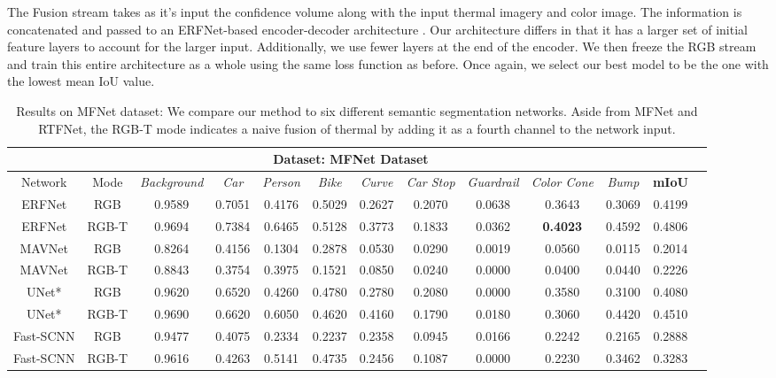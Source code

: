 \documentclass[letterpaper, 10 pt, conference]{ieeeconf}
\begin{document}
The Fusion stream takes as it's input the confidence volume along with the input thermal imagery and color image. The information is concatenated and passed to an ERFNet-based encoder-decoder architecture \cite{romera2017erfnet}. Our architecture differs in that it has a larger set of initial feature layers to account for the larger input. Additionally, we use fewer layers at the end of the encoder. We then freeze the RGB stream and train this entire architecture as a whole using the same loss function as before. Once again, we select our best model to be the one with the lowest mean IoU value.

\begin{table*}[htb!]
\centering
\caption{Results on MFNet dataset: We compare our method to six different semantic segmentation networks. Aside from MFNet and RTFNet, the RGB-T mode indicates a naive fusion of thermal by adding it as a fourth channel to the network input.}
\vspace{-0.25cm}
\begin{tabular}{|c|c|c|c|c|c|c|c|c|c|c|c|c|}
 \hline
 \multicolumn{12}{|c|}{Dataset: \textbf{MFNet Dataset}} \\
 \hline
 Network & Mode & \textit{Background} & \textit{Car} & \textit{Person} & \textit{Bike} & \textit{Curve} & \textit{Car Stop} & \textit{Guardrail} & \textit{Color Cone} & \textit{Bump} & \textbf{mIoU}\\
 \hline
 ERFNet & RGB  & 0.9589 & 0.7051 & 0.4176 & 0.5029 & 0.2627 & 0.2070 & 0.0638 & 0.3643 & 0.3069 & 0.4199\\
 ERFNet & RGB-T & 0.9694 & 0.7384 & 0.6465 & 0.5128 & 0.3773 & 0.1833 & 0.0362 & \textbf{0.4023} & 0.4592 & 0.4806\\
 MAVNet & RGB & 0.8264 & 0.4156 & 0.1304 & 0.2878 & 0.0530 & 0.0290 & 0.0019 & 0.0560 & 0.0115 & 0.2014\\
 MAVNet & RGB-T & 0.8843 & 0.3754 & 0.3975 & 0.1521 & 0.0850 & 0.0240 & 0.0000 & 0.0400 & 0.0440 & 0.2226\\
 UNet* & RGB & 0.9620 & 0.6520 & 0.4260 & 0.4780 & 0.2780 & 0.2080 & 0.0000 & 0.3580 & 0.3100 & 0.4080\\
 UNet* & RGB-T & 0.9690 & 0.6620 & 0.6050 & 0.4620 & 0.4160 & 0.1790 & 0.0180 & 0.3060 & 0.4420 & 0.4510\\
 Fast-SCNN & RGB & 0.9477 & 0.4075 & 0.2334 & 0.2237 & 0.2358 & 0.0945 & 0.0166 & 0.2242 & 0.2165 & 0.2888\\
 Fast-SCNN & RGB-T & 0.9616 & 0.4263 & 0.5141 & 0.4735 & 0.2456 & 0.1087 & 0.0000 & 0.2230 & 0.3462 & 0.3283\\ 

\end{tabular}
\end{table*}
\end{document}
